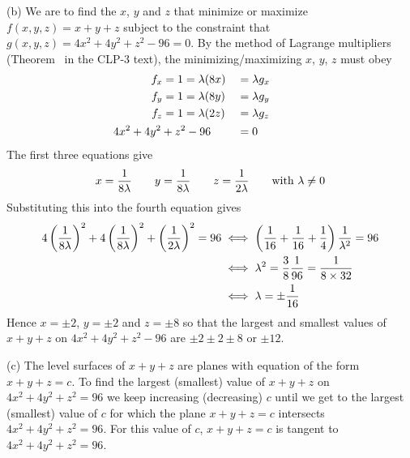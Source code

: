 \begin{solution}
(b)
We are to find the $x$, $y$ and $z$ that minimize or maximize 
$f(x,y,z)=x+y+z$ subject to the constraint that 
$g(x,y,z)=4x^2+4y^2+z^2-96=0$. By the method of
Lagrange multipliers (Theorem~ in the CLP-3 text),
the minimizing/maximizing $x$, $y$, $z$ must obey
\begin{alignat*}{3}
f_x&=1=\la(8x)&&=\la g_x\\
f_y&=1=\la(8y)&&=\la g_y\\
f_z&=1=\la(2z)&&=\la g_z\\
&\hskip-0.6in 4x^2+4y^2+z^2-96&&=0
\end{alignat*}
The first three equations give 
\begin{equation*}
x=\frac{1}{8\lambda}\qquad y=\frac{1}{8\lambda}\qquad z=\frac{1}{2\lambda}
\qquad\text{with }\lambda\ne 0
\end{equation*}
Substituting this into the fourth equation gives
\begin{align*}
4\left(\frac{1}{8\lambda}\right)^2+4\left(\frac{1}{8\lambda}\right)^2
+\left(\frac{1}{2\lambda}\right)^2=96 
&\iff
\left(\frac{1}{16}+\frac{1}{16}+\frac{1}{4}\right)\frac{1}{\lambda^2}=96 \\
&\iff
\lambda^2=\frac{3}{8}\frac{1}{96}=\frac{1}{8\times 32} \\
&\iff \lambda=\pm \frac{1}{16}
\end{align*}
Hence $x=\pm 2$, $y=\pm 2$ and $z=\pm 8$ so that the largest and smallest
values of $x+y+z$ on $4x^2+4y^2+z^2-96$ are $\pm 2\pm2 \pm 8$ or
$\pm 12$.

(c) The level surfaces of $x+y+z$ are planes with equation of the
form $x+y+z=c$. To find the largest (smallest) value of 
$x+y+z$ on $4x^2+4y^2+z^2=96$ we keep increasing (decreasing) $c$ until
we get to the largest (smallest) value of $c$ for which the plane 
$x+y+z=c$ intersects $4x^2+4y^2+z^2=96$. For this value of $c$, 
$x+y+z=c$ is tangent to $4x^2+4y^2+z^2=96$.
\end{solution}

